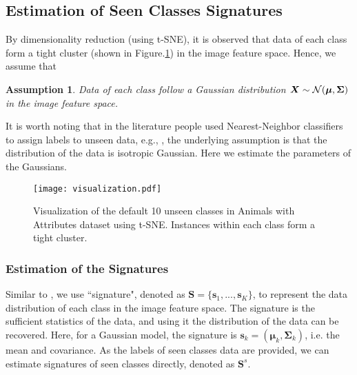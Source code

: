 \documentclass{article}
\newtheorem{as}{Assumption}
\begin{document}
\subsection{Estimation of Seen Classes Signatures}
By dimensionality reduction (using t-SNE\cite{maaten2008visualizing}), it is observed that data of each class form a tight cluster (shown in Figure.\ref{fig:visualization}) in the image feature space. Hence, we assume that
\begin{as}
\label{assum1}
Data of each class follow a Gaussian distribution
$\bm{X}\sim {\cal N}(\bm{\mu},\bm{\Sigma})$ in the image feature space.
\end{as}

It is worth noting that in the literature people used Nearest-Neighbor classifiers to assign labels to unseen data, e.g., \cite{palatucci2009zero} \cite{fu2016semi}, the underlying assumption is that the distribution of the data is isotropic Gaussian. Here we estimate the parameters of the Gaussians.

\begin{figure}[htbp]
  \centering
  \texttt{[image: visualization.pdf]}
  \caption{Visualization of the default 10 unseen classes in Animals with Attributes dataset using t-SNE. Instances within each class form a tight cluster.}
  \label{fig:visualization}
\end{figure}

\subsubsection{Estimation of the Signatures}
Similar to \cite{romera2015embarrassingly}, we use ``signature", denoted as $\bm{S}=\{\bm{s}_1,...,\bm{s}_K\}$, to represent the data distribution of each class in the image feature space. The signature is the sufficient statistics of the data, and using it the distribution of the data can be recovered. Here, for a Gaussian model, the signature is $\bm{s}_k =(\bm{\mu}_k ,\bm{\Sigma}_k)$, i.e. the mean and covariance. As the labels of seen classes data are provided, we can estimate signatures of seen classes directly, denoted as $\bm{S}^s$.
\end{document}

